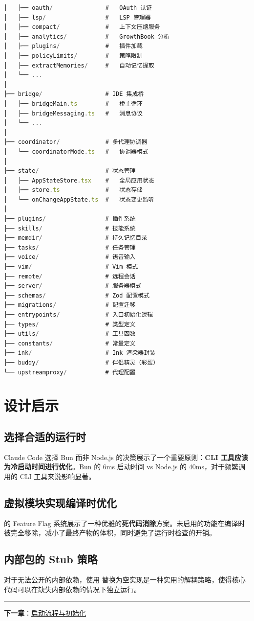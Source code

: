 \begin{lstlisting}[language=TypeScript,breaklines=true]
│   ├── oauth/               #   OAuth 认证
│   ├── lsp/                 #   LSP 管理器
│   ├── compact/             #   上下文压缩服务
│   ├── analytics/           #   GrowthBook 分析
│   ├── plugins/             #   插件加载
│   ├── policyLimits/        #   策略限制
│   ├── extractMemories/     #   自动记忆提取
│   └── ...
│
├── bridge/                  # IDE 集成桥
│   ├── bridgeMain.ts        #   桥主循环
│   ├── bridgeMessaging.ts   #   消息协议
│   └── ...
│
├── coordinator/             # 多代理协调器
│   └── coordinatorMode.ts   #   协调器模式
│
├── state/                   # 状态管理
│   ├── AppStateStore.tsx    #   全局应用状态
│   ├── store.ts             #   状态存储
│   └── onChangeAppState.ts  #   状态变更监听
│
├── plugins/                 # 插件系统
├── skills/                  # 技能系统
├── memdir/                  # 持久记忆目录
├── tasks/                   # 任务管理
├── voice/                   # 语音输入
├── vim/                     # Vim 模式
├── remote/                  # 远程会话
├── server/                  # 服务器模式
├── schemas/                 # Zod 配置模式
├── migrations/              # 配置迁移
├── entrypoints/             # 入口初始化逻辑
├── types/                   # 类型定义
├── utils/                   # 工具函数
├── constants/               # 常量定义
├── ink/                     # Ink 渲染器封装
├── buddy/                   # 伴侣精灵（彩蛋）
└── upstreamproxy/           # 代理配置
\end{lstlisting}

\section{设计启示}

\subsection{选择合适的运行时}

Claude Code 选择 Bun 而非 Node.js 的决策展示了一个重要原则：\textbf{CLI 工具应该为冷启动时间进行优化}。Bun 的 6ms 启动时间 vs Node.js 的 40ms，对于频繁调用的 CLI 工具来说影响显著。

\subsection{虚拟模块实现编译时优化}

 的 Feature Flag 系统展示了一种优雅的\textbf{死代码消除}方案。未启用的功能在编译时被完全移除，减小了最终产物的体积，同时避免了运行时检查的开销。

\subsection{内部包的 Stub 策略}

对于无法公开的内部依赖，使用  替换为空实现是一种实用的解耦策略，使得核心代码可以在缺失内部依赖的情况下独立运行。

\bigskip\noindent\rule{\textwidth}{0.4pt}\bigskip

\textbf{下一章}：\href{./chapter-03-startup.md}{启动流程与初始化}

